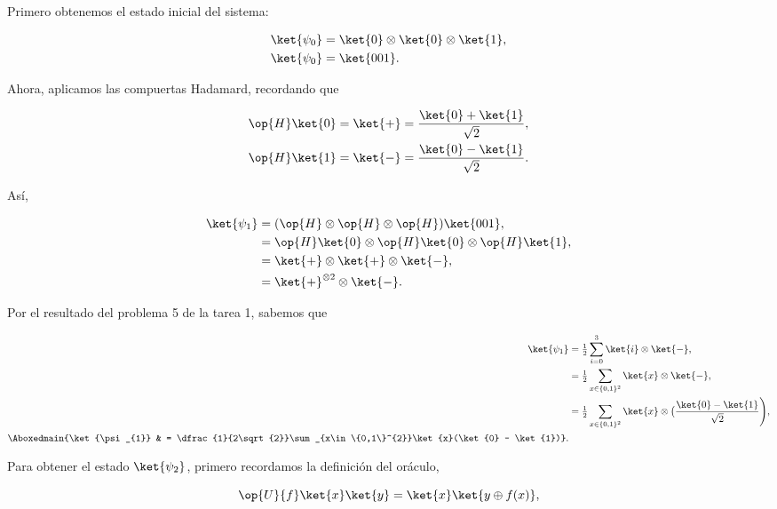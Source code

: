 \documentclass[./../main.tex]{subfiles}
\begin{document}
\startsolution

Primero obtenemos el estado inicial del sistema:

\begin{align}
	\ket{\psi_{0}} & = \tensprod{\ket{0}}{\ket{0}}[\ket{1}][nopar],\nonumber \\
	\ket{\psi_{0}} & = \ket{001}.\label{eq:psi0}
\end{align}

Ahora, aplicamos las compuertas Hadamard, recordando que

\begin{align*}
	\op{H}\ket{0} & = \ket{+} = \dfrac{\ket{0} + \ket{1}}{\sqrt{2}}, \\
	\op{H}\ket{1} & = \ket{-} = \dfrac{\ket{0} - \ket{1}}{\sqrt{2}}.
\end{align*}

Así,

\begin{align*}
	\ket{\psi_{1}} & = (\tensprod{\op{H}}{\op{H}}[\op{H}][nopar])\ket{001},           \\
	               & = \tensprod{\op{H}\ket{0}}{\op{H}\ket{0}}[\op{H}\ket{1}][nopar], \\
	               & = \tensprod{\ket{+}}{\ket{+}}[\ket{-}][nopar],                   \\
	               & = \tensprod{\ket{+}^{\otimes 2}}{\ket{-}}.
\end{align*}

Por el resultado del problema 5 de la tarea 1, sabemos que

\begin{align}
	\ket{\psi_{1}}             & = \tfrac{1}{2}\sum_{i = 0}^{3}\tensprod{\ket{i}}{\ket{-}},\nonumber                                                 \\
	                           & = \tfrac{1}{2}\sum_{x\in \{0,1\}^{2}}\tensprod{\ket{x}}{\ket{-}},\nonumber                                          \\
	                           & = \tfrac{1}{2}\sum_{x\in \{0,1\}^{2}}\tensprod{\ket{x}}{\bigl(\dfrac{\ket{0} - \ket{1}}{\sqrt{2}}\Biggr)},\nonumber \\
	\Aboxedmain{\ket{\psi_{1}} & = \dfrac{1}{2\sqrt{2}}\sum_{x\in \{0,1\}^{2}}\ket{x}(\ket{0} - \ket{1})}.\label{eq:psi1}
\end{align}

Para obtener el estado \(\ket{\psi_{2}}\), primero recordamos la definición del oráculo,

\begin{equation*}
	\op{U}{f}\ket{x}\ket{y} = \ket{x}\ket{y \oplus f(x)},
\end{equation*}
\end{document}
